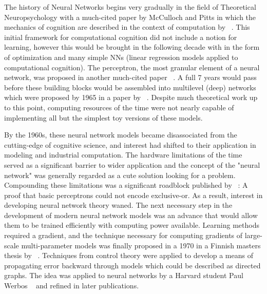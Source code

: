 The history of Neural Networks begins very gradually in the field of Theoretical
Neuropsychology with a much-cited paper by McCulloch and Pitts in
which the mechanics of cognition are described in the context of
computation by ~\citet{mcculloch1943logical}. This initial framework for
computational cognition did not include a notion for learning, however
this would be brought in the following decade with in the form of
optimization and many simple NNs (linear regression models applied to
computational cognition). The perceptron, the most granular element of
a neural network, was proposed in another much-cited paper ~\citet{rosenblatt1958perceptron}. A full 7 years
would pass before these building blocks would be assembled into
multilevel (deep) networks which were proposed by 1965 in a paper by ~\citet{ivakhnenko1965cybernetic}. Despite much
theoretical work up to this point, computing resources of the time
were not nearly capable of implementing all but the simplest toy
versions of these models. 

By the 1960s, these neural network models became disassociated from
the cutting-edge of cognitive science, and interest had shifted to
their application in modeling and industrial computation. The hardware
limitations of the time served as a significant barrier to wider
application and the concept of the "neural network" was generally
regarded as a cute solution looking for a problem. Compounding these
limitations was a significant roadblock published by ~\citet{minsky1969perceptrons}: A proof that basic perceptrons could not encode exclusive-or. As a result, interest in developing
neural network theory waned. The next necessary step in the
development of modern neural network models was an advance that would
allow them to be trained efficiently with computing power
available. Learning methods required a gradient, and the technique
necessary for computing gradients of large-scale multi-parameter
models was finally proposed in a 1970 in a Finnish masters thesis by
~\citet{linnainmaa1970representation}. Techniques from control theory
were applied to develop a means of propagating error backward through
models which could be described as directed graphs. The idea was
applied to neural networks by a Harvard student Paul Werbos ~\citep{werbos1974beyond} and refined in later publications. 

